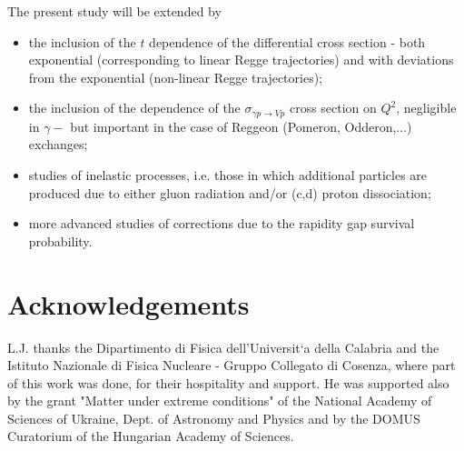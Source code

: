 \documentclass[12pt]{article}
\begin{document}
The present study will be extended by
\begin{itemize}
\item the inclusion of the $t$ dependence of the differential cross section - both exponential (corresponding to linear Regge trajectories) and with deviations from the exponential 
(non-linear Regge trajectories);
\item the inclusion of the dependence of the $\sigma_{\gamma p \rightarrow V p}$ cross section on $Q^2$, negligible in $\gamma-$ but important in the case of Reggeon (Pomeron, Odderon,...) exchanges;
\item studies of inelastic processes, i.e. those in which additional particles are produced due to either gluon radiation and/or (c,d) proton dissociation;
\item more advanced studies of corrections due to the rapidity gap survival probability.
\end{itemize}


 \section*{Acknowledgements}
L.J. thanks the Dipartimento di Fisica dell'Universit`a della Calabria and the Istituto Nazionale di Fisica Nucleare - Gruppo Collegato di Cosenza, where part of this work was done, for their hospitality and support. 
He was supported also by the grant "Matter under extreme conditions" of the
National Academy of Sciences of Ukraine, Dept. of Astronomy and
Physics and by the DOMUS Curatorium of the Hungarian Academy of Sciences.
\end{document}
